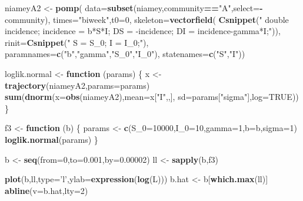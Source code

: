 \documentclass[]{book}
\newenvironment{Shaded}{\begin{snugshade}}{\end{snugshade}}
\newcommand{\KeywordTok}[1]{\textcolor[rgb]{0.13,0.29,0.53}{\textbf{#1}}}
\newcommand{\DataTypeTok}[1]{\textcolor[rgb]{0.13,0.29,0.53}{#1}}
\newcommand{\DecValTok}[1]{\textcolor[rgb]{0.00,0.00,0.81}{#1}}
\newcommand{\FloatTok}[1]{\textcolor[rgb]{0.00,0.00,0.81}{#1}}
\newcommand{\StringTok}[1]{\textcolor[rgb]{0.31,0.60,0.02}{#1}}
\newcommand{\OtherTok}[1]{\textcolor[rgb]{0.56,0.35,0.01}{#1}}
\newcommand{\ControlFlowTok}[1]{\textcolor[rgb]{0.13,0.29,0.53}{\textbf{#1}}}
\newcommand{\OperatorTok}[1]{\textcolor[rgb]{0.81,0.36,0.00}{\textbf{#1}}}
\newcommand{\NormalTok}[1]{#1}
\begin{document}
\begin{Shaded}
\begin{Highlighting}[]
\NormalTok{niameyA2 <-}\StringTok{ }\KeywordTok{pomp}\NormalTok{(}
  \DataTypeTok{data=}\KeywordTok{subset}\NormalTok{(niamey,community}\OperatorTok{==}\StringTok{"A"}\NormalTok{,}\DataTypeTok{select=}\OperatorTok{-}\NormalTok{community),}
  \DataTypeTok{times=}\StringTok{"biweek"}\NormalTok{,}\DataTypeTok{t0=}\DecValTok{0}\NormalTok{,}
  \DataTypeTok{skeleton=}\KeywordTok{vectorfield}\NormalTok{(}
    \KeywordTok{Csnippet}\NormalTok{(}\StringTok{"}
\StringTok{      double incidence;}
\StringTok{      incidence = b*S*I;}
\StringTok{      DS = -incidence;}
\StringTok{      DI = incidence-gamma*I;"}\NormalTok{)),}
  \DataTypeTok{rinit=}\KeywordTok{Csnippet}\NormalTok{(}\StringTok{"}
\StringTok{      S = S_0;}
\StringTok{      I = I_0;"}\NormalTok{),}
  \DataTypeTok{paramnames=}\KeywordTok{c}\NormalTok{(}\StringTok{"b"}\NormalTok{,}\StringTok{"gamma"}\NormalTok{,}\StringTok{"S_0"}\NormalTok{,}\StringTok{"I_0"}\NormalTok{),}
  \DataTypeTok{statenames=}\KeywordTok{c}\NormalTok{(}\StringTok{"S"}\NormalTok{,}\StringTok{"I"}\NormalTok{))}

\NormalTok{loglik.normal <-}\StringTok{ }\ControlFlowTok{function}\NormalTok{ (params) \{}
\NormalTok{  x <-}\StringTok{ }\KeywordTok{trajectory}\NormalTok{(niameyA2,}\DataTypeTok{params=}\NormalTok{params)}
  \KeywordTok{sum}\NormalTok{(}\KeywordTok{dnorm}\NormalTok{(}\DataTypeTok{x=}\KeywordTok{obs}\NormalTok{(niameyA2),}\DataTypeTok{mean=}\NormalTok{x[}\StringTok{"I"}\NormalTok{,,],}
            \DataTypeTok{sd=}\NormalTok{params[}\StringTok{"sigma"}\NormalTok{],}\DataTypeTok{log=}\OtherTok{TRUE}\NormalTok{))}
\NormalTok{\}}

\NormalTok{f3 <-}\StringTok{ }\ControlFlowTok{function}\NormalTok{ (b) \{}
\NormalTok{  params <-}\StringTok{ }\KeywordTok{c}\NormalTok{(}\DataTypeTok{S_0=}\DecValTok{10000}\NormalTok{,}\DataTypeTok{I_0=}\DecValTok{10}\NormalTok{,}\DataTypeTok{gamma=}\DecValTok{1}\NormalTok{,}\DataTypeTok{b=}\NormalTok{b,}\DataTypeTok{sigma=}\DecValTok{1}\NormalTok{)}
  \KeywordTok{loglik.normal}\NormalTok{(params)}
\NormalTok{\}}

\NormalTok{b <-}\StringTok{ }\KeywordTok{seq}\NormalTok{(}\DataTypeTok{from=}\DecValTok{0}\NormalTok{,}\DataTypeTok{to=}\FloatTok{0.001}\NormalTok{,}\DataTypeTok{by=}\FloatTok{0.00002}\NormalTok{)}
\NormalTok{ll <-}\StringTok{ }\KeywordTok{sapply}\NormalTok{(b,f3)}

\KeywordTok{plot}\NormalTok{(b,ll,}\DataTypeTok{type=}\StringTok{'l'}\NormalTok{,}\DataTypeTok{ylab=}\KeywordTok{expression}\NormalTok{(}\KeywordTok{log}\NormalTok{(L)))}
\NormalTok{b.hat <-}\StringTok{ }\NormalTok{b[}\KeywordTok{which.max}\NormalTok{(ll)]}
\KeywordTok{abline}\NormalTok{(}\DataTypeTok{v=}\NormalTok{b.hat,}\DataTypeTok{lty=}\DecValTok{2}\NormalTok{)}
\end{Highlighting}
\end{Shaded}
\end{document}
